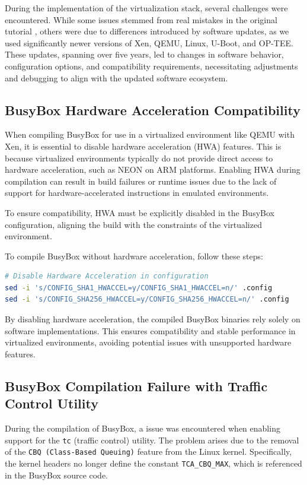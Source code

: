 \documentclass[acmtog]{acmart}
\begin{document}
During the implementation of the virtualization stack, several challenges were encountered. While some issues stemmed from real mistakes in the original tutorial \cite{obrezkov2019xen}, others were due to differences introduced by software updates, as we used significantly newer versions of Xen, QEMU, Linux, U-Boot, and OP-TEE. These updates, spanning over five years, led to changes in software behavior, configuration options, and compatibility requirements, necessitating adjustments and debugging to align with the updated software ecosystem.


\subsection{BusyBox Hardware Acceleration Compatibility}

When compiling BusyBox for use in a virtualized environment like QEMU with Xen, it is essential to disable hardware acceleration (HWA) features. This is because virtualized environments typically do not provide direct access to hardware acceleration, such as NEON on ARM platforms. Enabling HWA during compilation can result in build failures or runtime issues due to the lack of support for hardware-accelerated instructions in emulated environments.

To ensure compatibility, HWA must be explicitly disabled in the BusyBox configuration, aligning the build with the constraints of the virtualized environment.

To compile BusyBox without hardware acceleration, follow these steps:

\begin{lstlisting}[language=bash, caption=Solution to HWA Fault]
# Disable Hardware Acceleration in configuration
sed -i 's/CONFIG_SHA1_HWACCEL=y/CONFIG_SHA1_HWACCEL=n/' .config
sed -i 's/CONFIG_SHA256_HWACCEL=y/CONFIG_SHA256_HWACCEL=n/' .config
\end{lstlisting}


By disabling hardware acceleration, the compiled BusyBox binaries rely solely on software implementations. This ensures compatibility and stable performance in virtualized environments, avoiding potential issues with unsupported hardware features.



\subsection{BusyBox Compilation Failure with Traffic Control Utility}
During the compilation of BusyBox, a issue was encountered when enabling support for the \texttt{tc} (traffic control) utility. The problem arises due to the removal of the \texttt{CBQ (Class-Based Queuing)} feature from the Linux kernel. Specifically, the kernel headers no longer define the constant \texttt{TCA\_CBQ\_MAX}, which is referenced in the BusyBox source code.
\end{document}
